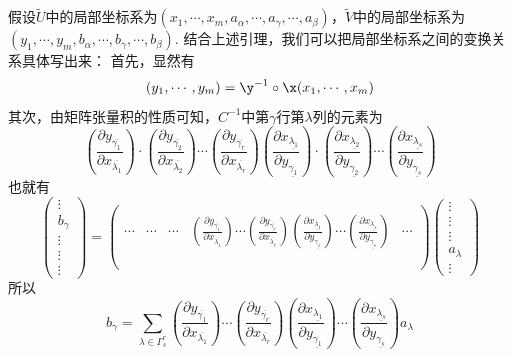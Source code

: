假设$\tilde{  U  }$中的局部坐标系为$(x_{1},\cdots,x_{m},a_{\alpha},\cdots,a_{\gamma},\cdots,a_{\beta})$，$\tilde{  V  }$中的局部坐标系为$(y_{1},\cdots,y_{m},b_{\alpha},\cdots,b_{\gamma},\cdots,b_{\beta})$. 结合上述引理，我们可以把局部坐标系之间的变换关系具体写出来：
首先，显然有
\begin{equation}
	(y_{1},\cdots,y_{m})=\y^{-1}\circ\x(x_{1},\cdots,x_{m})
\end{equation}
其次，由矩阵张量积的性质可知，$C^{-1}$中第$\gamma$行第$\lambda$列的元素为
\[\left(\frac { \partial y_{\overline{\gamma_{1}}} } { \partial x _ { \overline{\lambda_{1}} } }\right)\cdot \left(\frac { \partial y_{\overline{\gamma_{2}}} } { \partial x _ { \overline{\lambda_{2}} } }\right)\cdots\left(\frac { \partial y_{\overline{\gamma_{r}}} } { \partial x _ { \overline{\lambda_{r}} } }\right)\left(\frac { \partial x_{\underline{\lambda_{1}}} } { \partial y _ { \underline{\gamma_{1}} } }\right)\cdot\left(\frac { \partial x_{\underline{\lambda_{2}}} } { \partial y _ { \underline{\gamma_{2}} } }\right)\cdots\left(\frac { \partial x_{\underline{\lambda_{s}}} } { \partial y _ { \underline{\gamma_{s}} } }\right)\]
也就有
\[
\left( \begin{array}{ccccc}{\vdots} \\ {b_{\gamma}}  \\ {\vdots} \\ {\vdots}\\ {\vdots}\end{array}\right)=\left( \begin{array}{ccccc}{ } & { } & { } & { }&{} \\ { \cdots} & {\cdots} & {\cdots} & { \boxed{\left(\frac { \partial y_{\overline{\gamma_{1}}} } { \partial x _ { \overline{\lambda_{1}} } }\right)\cdots\left(\frac { \partial y_{\overline{\gamma_{r}}} } { \partial x _ { \overline{\lambda_{r}} } }\right)\left(\frac { \partial x_{\underline{\lambda_{1}}} } { \partial y _ { \underline{\gamma_{1}} } }\right)\cdots\left(\frac { \partial x_{\underline{\lambda_{s}}} } { \partial y _ { \underline{\gamma_{s}} } }\right)}} &{\cdots}\\ { } & { } & { } & { } &{}\\ { } & { } & { } & { }&{}\\ { } & { } & { } & { }&{}\end{array}\right)\left( \begin{array}{ccccc}{\vdots} \\ {\vdots}  \\ {\vdots} \\ {a_{\lambda}}\\ {\vdots}\end{array}\right)
\]
所以
\begin{equation}
	b_{\gamma}=\sum\limits_{\lambda\in \Gamma^{r}_{s}}\left(\frac { \partial y_{\overline{\gamma_{1}}} } { \partial x _ { \overline{\lambda_{1}} } }\right)\cdots\left(\frac { \partial y_{\overline{\gamma_{r}}} } { \partial x _ { \overline{\lambda_{r}} } }\right)\left(\frac { \partial x_{\underline{\lambda_{1}}} } { \partial y _ { \underline{\gamma_{1}} } }\right)\cdots\left(\frac { \partial x_{\underline{\lambda_{s}}} } { \partial y _ { \underline{\gamma_{s}} } }\right) a_{\lambda}
\end{equation}

